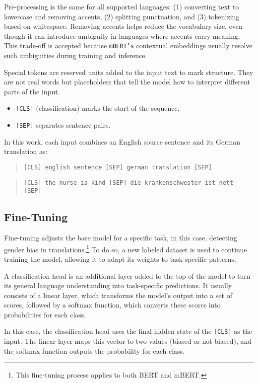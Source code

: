 Pre-processing is the same for all supported languages: (1) converting text to lowercase and removing accents, (2) splitting punctuation, and (3) tokenizing based on whitespace. Removing accents helps reduce the vocabulary size, even though it can introduce ambiguity in languages where accents carry meaning. This trade-off is accepted because \texttt{mBERT's} contextual embeddings usually resolve such ambiguities during training and inference.

Special tokens are reserved units added to the input text to mark structure. They are not real words but placeholders that tell the model how to interpret different parts of the input.

\begin{itemize}
	\item \texttt{[CLS]} (classification) marks the start of the sequence,
	\item \texttt{[SEP]} separates sentence pairs.
\end{itemize}

\noindent In this work, each input combines an English source sentence and its German translation as:

\begin{quote}
    \texttt{[CLS] english sentence [SEP] german translation [SEP]}
\end{quote}

\begin{quote}
\texttt{[CLS] the nurse is kind [SEP] die krankenschwester ist nett [SEP]}
\end{quote}

\subsection{Fine-Tuning}
    Fine-tuning adjusts the base model for a specific task, in this case, detecting gender bias in translations.\footnote{This fine-tuning process applies to both BERT and mBERT.} To do so, a new labeled dataset is used to continue training the model, allowing it to adapt its weights to task-specific patterns. 

    A classification head is an additional layer added to the top of the model to turn its general language understanding into task-specific predictions. It usually consists of a linear layer, which transforms the model’s output into a set of scores, followed by a softmax function, which converts these scores into probabilities for each class.

    In this case, the classification head uses the final hidden state of the \texttt{[CLS]} as the input. The linear layer maps this vector to two values (biased or not biased), and the softmax function outputs the probability for each class.

